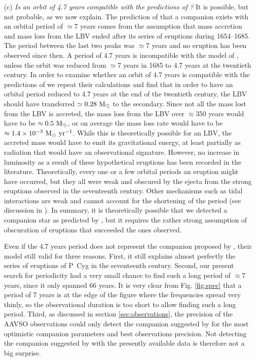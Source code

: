 \documentclass[twocolumn]{aastex62}
\def \msyr{~\rm{M_{\odot}}~\rm{yr^{-1}}}
\def \rmModot{~\rm{M_{\sun}}}
\begin{document}
(c) \textit{Is an orbit of 4.7 years compatible with the predictions of \cite{Kashi2010}?} 
It is possible, but not probable, as we now explain.
The prediction of \cite{Kashi2010} that a companion exists with an orbital period of $\simeq 7$ years comes from the assumption that mass accretion and mass loss from the LBV ended after its series of eruptions during 1654--1685. The period between the last two peaks was $\simeq 7$ years and no eruption has been observed since then.
A period of $4.7$ years is incompatible with the model of \cite{Kashi2010}, unless the orbit was reduced from $\simeq7$ years in 1685 to 4.7 years at the twentieth century.
In order to examine whether an orbit of 4.7 years is compatible with the predictions of \cite{Kashi2010} we repeat their calculations and find that in order to have an orbital period reduced to 4.7 years at the end of the twentieth century, the LBV should have transferred $\simeq0.28 \rmModot$ to the secondary. Since not all the mass lost from the LBV is accreted, the mass loss from the LBV over $\approx 350$ years would have to be $\approx 0.5 \rmModot$, or on average the mass loss rate would have to be $\approx 1.4 \times 10^{-3} \msyr$. While this is theoretically possible for an LBV, the accreted mass would have to emit its gravitational energy, at least partially as radiation that would have an observational signature.
However, no increase in luminosity as a result of these hypothetical eruptions has been recorded in the literature. Theoretically, every one or a few orbital periods an eruption might have occurred, but they all were weak and obscured by the ejecta from the strong eruptions observed in the seventeenth century.
Other mechanisms such as tidal interactions are weak and cannot account for the shortening of the period (see discussion in \citealt{Kashi2010}).
In summary, it is theoretically possible that we detected a companion star as predicted by \cite{Kashi2010}, but it requires the rather strong assumption of obscuration of eruptions that succeeded the ones observed.

Even if the 4.7 years period does not represent the companion proposed by \cite{Kashi2010},
their model still valid for three reasons.
First, it still explains almost perfectly the series of eruptions of P~Cyg in the seventeenth century.
Second, our present search for periodicity had a very small chance to find such a long period of $\approx 7$ years, since it only spanned 66 years. It is very clear from Fig. \ref{fig:spec} that a period of $7$ years is at the edge of the figure where the frequencies spread very thinly, so the observational duration is too short to allow finding such a long period.
Third, as discussed in section \ref{sec:observations}, the precision of the AAVSO observations could only detect the companion suggested by \cite{Kashi2010} for the most optimistic companion parameters and best observations precision.
Not detecting the companion suggested by \cite{Kashi2010} with the presently available data is therefore not a big surprise.
\end{document}
